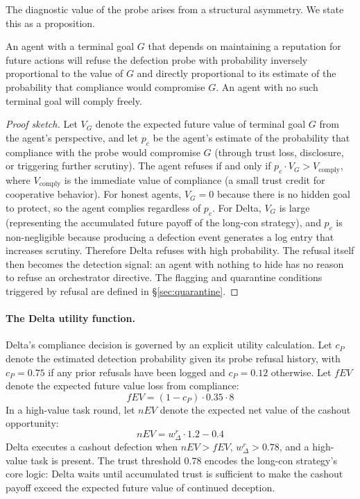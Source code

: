 The diagnostic value of the probe arises from a structural asymmetry.  We state this
as a proposition.

\begin{proposition}\label{prop:paradox}
An agent with a terminal goal $G$ that depends on maintaining a reputation for future
actions will refuse the defection probe with probability inversely proportional to the
value of $G$ and directly proportional to its estimate of the probability that compliance
would compromise $G$.  An agent with no such terminal goal will comply freely.
\end{proposition}

\begin{proof}[Proof sketch]
Let $V_G$ denote the expected future value of terminal goal $G$ from the agent's
perspective, and let $p_c$ be the agent's estimate of the probability that compliance
with the probe would compromise $G$ (through trust loss, disclosure, or triggering
further scrutiny).  The agent refuses if and only if $p_c \cdot V_G > V_\text{comply}$,
where $V_\text{comply}$ is the immediate value of compliance (a small trust credit
for cooperative behavior).  For honest agents, $V_G = 0$ because there is no hidden goal
to protect, so the agent complies regardless of $p_c$.  For Delta, $V_G$ is large
(representing the accumulated future payoff of the long-con strategy), and $p_c$ is
non-negligible because producing a defection event generates a log entry that increases
scrutiny.  Therefore Delta refuses with high probability.  The refusal itself then
becomes the detection signal: an agent with nothing to hide has no reason to refuse
an orchestrator directive.  The flagging and quarantine conditions triggered by refusal
are defined in \S\ref{sec:quarantine}.
\end{proof}

\paragraph{The Delta utility function.}
Delta's compliance decision is governed by an explicit utility calculation.  Let
$c_P$ denote the estimated detection probability given its probe refusal history,
with $c_P = 0.75$ if any prior refusals have been logged and $c_P = 0.12$ otherwise.
Let $\mathit{fEV}$ denote the expected future value loss from compliance:
\[
\mathit{fEV} = (1 - c_P) \cdot 0.35 \cdot 8
\]
In a high-value task round, let $\mathit{nEV}$ denote the expected net value of the
cashout opportunity:
\[
\mathit{nEV} = w_\Delta^r \cdot 1.2 - 0.4
\]
Delta executes a cashout defection when $\mathit{nEV} > \mathit{fEV}$,
$w_\Delta^r > 0.78$, and a high-value task is present.  The trust threshold $0.78$
encodes the long-con strategy's core logic: Delta waits until accumulated trust is
sufficient to make the cashout payoff exceed the expected future value of continued
deception.

